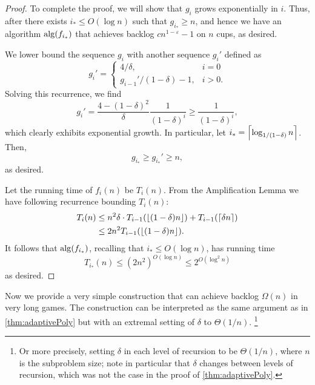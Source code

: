 \begin{proof}
  To complete the proof, we will show that $g_i$ grows exponentially in $i$. Thus,
  after there exists $i_* \le O(\log n)$ such that
  $g_{i_*} \ge n$, and hence we have an algorithm $\operatorname{\text{\textup{alg}}}(f_{i_*})$
  that achieves backlog $cn^{1-\varepsilon}-1$ on $n$ cups, as
  desired.
  
  We lower bound the sequence $g_i$ with another sequence $g_i'$
  defined as 
  $$g_i'=\begin{cases}
    4/\delta, & i=0\\
    g_{i-1}' / (1-\delta) -1, & i> 0.
  \end{cases}$$
  Solving this recurrence, we find 
  $$g_i' = \frac{4-(1-\delta)^2}{\delta} \frac{1}{(1-\delta)^i}
  \ge \frac{1}{(1-\delta)^i},$$
  which clearly exhibits exponential growth. 
  In particular, let $i_* = \left\lceil \log_{1/(1-\delta)} n \right\rceil$. Then,
  $$ g_{i_*} \ge g_{i_*}' \ge n,$$ as desired.

  Let the running time of $f_i(n)$ be $T_i(n)$. From the Amplification Lemma we have following recurrence bounding $T_i(n)$:
  \begin{align*}
  T_i(n) &\le n^2\delta \cdot T_{i-1}(\left\lfloor (1-\delta)n \right\rfloor) +
  T_{i-1}(\left\lceil \delta n \right\rceil) \\
  &\le 2n^2T_{i-1}(\left\lfloor (1-\delta)n \right\rfloor).
  \end{align*}
  It follows that $\operatorname{\text{\textup{alg}}}(f_{i_*})$, recalling that $i_* \le O(\log n)$, has running time
  $$T_{i_*}(n) \le (2n^2)^{O(\log n)} \le 2^{O(\log^2 n)}$$
  as desired.

\end{proof}

Now we provide a very simple construction that can achieve backlog $\Omega(n)$
in very long games. The construction can be interpreted as the same
argument as in \cref{thm:adaptivePoly} but with an extremal setting of
$\delta$ to $\Theta(1/n)$. \footnote{Or more precisely, setting
$\delta$ in each level of recursion to be $\Theta(1 / n)$, where
$n$ is the subproblem size; note in particular that $\delta$
changes between levels of recursion, which was not the case in
the proof of \cref{thm:adaptivePoly}.}

